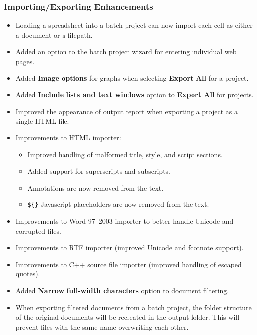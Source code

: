 \documentclass[
]{book}
\providecommand{\tightlist}{%
  \setlength{\itemsep}{0pt}\setlength{\parskip}{0pt}}
\theoremstyle{definition}
\theoremstyle{definition}
\theoremstyle{definition}
\theoremstyle{definition}
\theoremstyle{remark}
\begin{document}
\hypertarget{importingexporting-enhancements}{%
\subsubsection*{Importing/Exporting Enhancements}\label{importingexporting-enhancements}}

\begin{itemize}
\tightlist
\item
  Loading a spreadsheet into a batch project can now import each cell as either a document or a filepath.
\item
  Added an option to the batch project wizard for entering individual web pages.
\item
  Added \textbf{Image options} for graphs when selecting \textbf{Export All} for a project.
\item
  Added \textbf{Include lists and text windows} option to \textbf{Export All} for projects.
\item
  Improved the appearance of output report when exporting a project as a single HTML file.
\item
  Improvements to HTML importer:

  \begin{itemize}
  \tightlist
  \item
    Improved handling of malformed title, style, and script sections.
  \item
    Added support for superscripts and subscripts.
  \item
    Annotations are now removed from the text.
  \item
    \texttt{\$\{\}} Javascript placeholders are now removed from the text.
  \end{itemize}
\item
  Improvements to Word 97--2003 importer to better handle Unicode and corrupted files.
\item
  Improvements to RTF importer (improved Unicode and footnote support).
\item
  Improvements to C++ source file importer (improved handling of escaped quotes).
\item
  Added \textbf{Narrow full-width characters} option to \protect\hyperlink{additional-filtering-options}{document filtering}.
\item
  When exporting filtered documents from a batch project, the folder structure of the original documents will be recreated in the output folder. This will prevent files with the same name overwriting each other.
\end{itemize}
\end{document}
